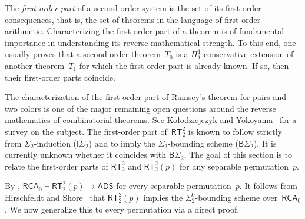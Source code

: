 \documentclass{article}
\numberwithin{theorem}{section}
\newtheorem{proposition}[theorem]{Proposition}
\newcommand{\BSig}{\mathsf{B}\Sigma^0}
\newcommand{\RCA}[0]{\mathsf{RCA}}
\newcommand{\ADS}[0]{\mathsf{ADS}}
\newcommand{\RT}[0]{\mathsf{RT}}
\begin{document}
The \emph{first-order part} of a second-order system is the set of its first-order consequences, that is, the set of theorems in the language of first-order arithmetic. Characterizing the first-order part of a theorem is of fundamental importance in understanding its reverse mathematical strength. To this end, one usually proves that a second-order theorem~$T_0$ is a $\Pi^1_1$-conservative extension of another theorem~$T_1$ for which the first-order part is already known. If so, then their first-order parts coincide.

The characterization of the first-order part of Ramsey's theorem for pairs and two colors is one of the major remaining open questions around the reverse mathematics of combinatorial theorems. See Ko\l odziejczyk and Yokoyama~\cite{kolo2021search} for a survey on the subject. The first-order part of~$\RT^2_2$ is known to follow strictly from $\Sigma_2$-induction ($\mathsf{I}\Sigma_2$) and to imply the $\Sigma_2$-bounding scheme ($\mathsf{B}\Sigma_2$). It is currently unknown whether it coincides with $\mathsf{B}\Sigma_2$. The goal of this section is to relate the first-order parts of $\RT^2_2$ and $\RT^2_2(p)$ for any separable permutation~$p$.

By , $\RCA_0 \vdash \RT^2_2(p) \to \ADS$ for every separable permutation~$p$.
It follows from Hirschfeldt and Shore~\cite{hirschfeldt2007combinatorial} that $\RT^2_2(p)$ implies the $\Sigma^0_2$-bounding scheme over~$\RCA_0$. We now generalize this to every permutation via a direct proof.

\end{document}
